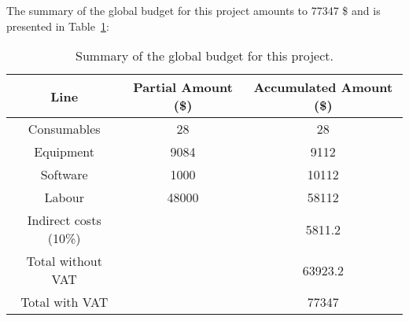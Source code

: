 The summary of the global budget for this project amounts to 77347 \$ and is presented in Table~\ref{tab:global}:
\begin{table}[h!]
	\centering
	\begin{tabular}{ccc}
		\toprule
		Line  & \multicolumn{1}{p{5.5em}}{Partial Amount (\$)} & \multicolumn{1}{p{5.5em}}{Accumulated Amount (\$)} \\
		\midrule
		Consumables & 28    & 28 \\
		\midrule
		Equipment & 9084  & 9112 \\
		\midrule
		Software & 1000  & 10112 \\
		\midrule
		Labour & 48000 & 58112 \\
		\midrule
		Indirect costs (10\%) &       & 5811.2 \\
		\midrule
		Total without VAT &       & 63923.2 \\
		\midrule
		Total with VAT &       & 77347 \\
		\bottomrule
	\end{tabular}%
\caption{Summary of the global budget for this project.}
\label{tab:global}%
\end{table}%


